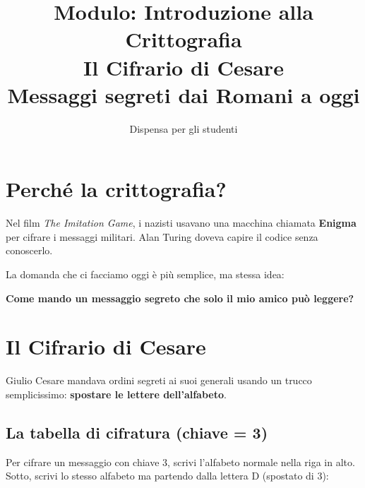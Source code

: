 \documentclass[12pt,a4paper]{article}
\title{
  {\large Modulo: Introduzione alla Crittografia}\\[0.5em]
  {\LARGE \textbf{Il Cifrario di Cesare}}\\[0.5em]
  {\large Messaggi segreti dai Romani a oggi}
}
\author{Dispensa per gli studenti}
\date{}
\begin{document}
\maketitle
\thispagestyle{fancy}

\section*{Perché la crittografia?}

Nel film \textit{The Imitation Game}, i nazisti usavano una macchina
chiamata \textbf{Enigma} per cifrare i messaggi militari. Alan Turing
doveva capire il codice senza conoscerlo.

La domanda che ci facciamo oggi è più semplice, ma stessa idea:

\begin{center}
  \large\textbf{Come mando un messaggio segreto che solo il mio amico
  può leggere?}
\end{center}

\section{Il Cifrario di Cesare}

Giulio Cesare mandava ordini segreti ai suoi generali usando un
trucco semplicissimo: \textbf{spostare le lettere dell'alfabeto}.

\subsection{La tabella di cifratura (chiave = 3)}

Per cifrare un messaggio con chiave 3, scrivi l'alfabeto normale
nella riga in alto. Sotto, scrivi lo stesso alfabeto ma partendo
dalla lettera D (spostato di 3):
\end{document}
